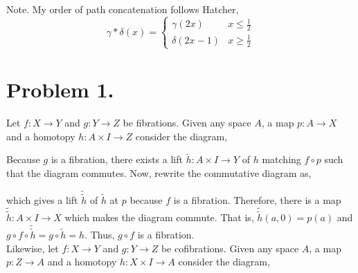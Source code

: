 \documentclass[12pt]{extarticle}
\begin{document}

Note. My order of path concatenation follows Hatcher,
\[\gamma * \delta(x) = \begin{cases}
\gamma(2x) & x \le \tfrac{1}{2} \\
\delta(2x - 1) & x \ge \tfrac{1}{2}
\end{cases}\]
 
\section*{Problem 1.}
Let $f : X \to Y$ and $g : Y \to Z$ be fibrations. Given any space $A$, a map $p : A \to X$ and a homotopy $h : A \times I \to Z$ consider the diagram,
\begin{center}
\end{center} 
Because $g$ is a fibration, there exists a lift $\tilde{h} : A \times I \to Y$ of $h$ matching $f \circ p$ such that the diagram commutes. Now, rewrite the commutative diagram as,
\begin{center}
\end{center} 
which gives a lift $\tilde{\tilde{h}}$ of $\tilde{h}$ at $p$ because $f$ is a fibration. Therefore, there is a map $\tilde{\tilde{h}} : A \times I \to X$ which makes the diagram commute. That is, $\tilde{\tilde{h}}(a, 0) = p(a)$ and $g \circ f \circ \tilde{\tilde{h}} = g \circ \tilde{h} = h$. Thus, $g \circ f$ is a fibration.
\bigskip \\
Likewise, let $f : X \to Y$ and $g : Y \to Z$ be cofibrations. Given any space $A$, a map $p : Z \to A$ and a homotopy $h : X \times I \to A$ consider the diagram,
\begin{center}
\end{center} 
\end{document}
